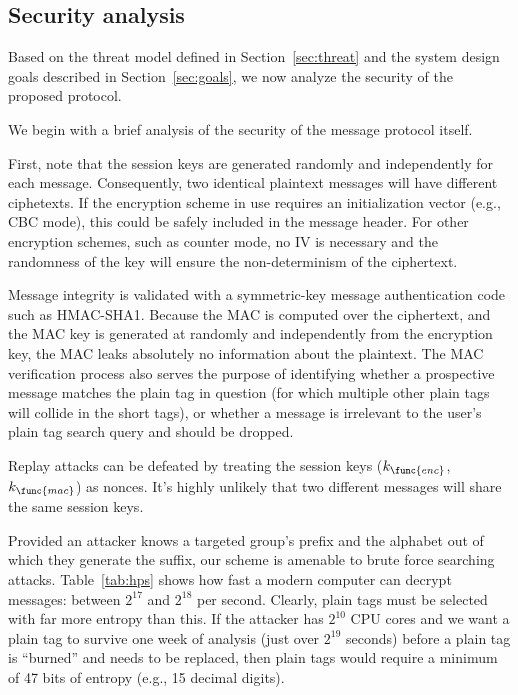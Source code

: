 \subsection{Security analysis}
\label{sec:security}

Based on the threat model defined in Section~\ref{sec:threat} and the
system design goals described in Section~\ref{sec:goals}, we now analyze
the security of the proposed \hoot protocol.

%
We begin with a brief analysis of the security of the message protocol
itself.

First, note that the session keys are generated randomly and
independently for each message. Consequently, two identical plaintext messages
will have different ciphetexts. If the encryption scheme in use requires
an initialization vector (e.g., CBC mode), this could be safely included in the
message header. For other encryption schemes, such as counter mode, no
IV is necessary and the randomness of the key will ensure the
non-determinism of the ciphertext.

Message integrity is validated with a symmetric-key message
authentication code such as HMAC-SHA1. Because the MAC is computed over the
ciphertext, and the MAC key is generated at randomly and independently
from the encryption key, the MAC leaks
absolutely no information about the plaintext. The MAC verification
process also serves the purpose of identifying whether a prospective
message matches the plain tag in question (for which multiple other
plain tags will collide in the short tags), or whether a message is
irrelevant to the user's plain tag search query and should be dropped.

Replay attacks can be defeated by treating the session keys
($k_{\func{enc}}$, $k_{\func{mac}}$) as nonces. It's highly unlikely
that two different messages will share the same session keys.


%
Provided an attacker knows a targeted group's prefix and the alphabet
out of which they generate the suffix, our scheme is amenable to brute
force searching attacks. Table~\ref{tab:hps} shows how fast a modern
computer can decrypt \hoot messages: between $2^{17}$ and $2^{18}$ per
second. Clearly, plain tags must be selected with far more entropy
than this. If the attacker has $2^{10}$ CPU cores and we want a plain
tag to survive one week of analysis (just over $2^{19}$ seconds)
before a plain tag is ``burned'' and needs to be replaced, then
plain tags would require a minimum of 47 bits of entropy (e.g., 15
decimal digits). 

